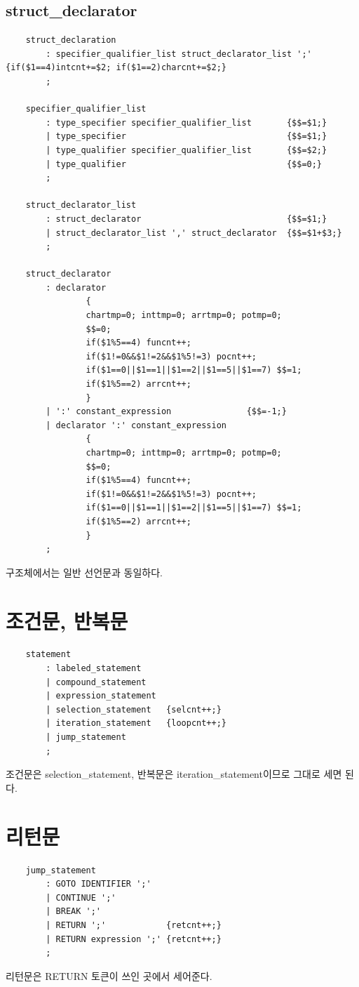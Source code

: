 \documentclass{oblivoir}
\begin{document}
\subsection{struct\_declarator}
\begin{verbatim}
    struct_declaration
        : specifier_qualifier_list struct_declarator_list ';' {if($1==4)intcnt+=$2; if($1==2)charcnt+=$2;}
        ;

    specifier_qualifier_list
        : type_specifier specifier_qualifier_list       {$$=$1;}
        | type_specifier                                {$$=$1;}
        | type_qualifier specifier_qualifier_list       {$$=$2;}
        | type_qualifier                                {$$=0;}
        ;

    struct_declarator_list
        : struct_declarator                             {$$=$1;}
        | struct_declarator_list ',' struct_declarator  {$$=$1+$3;}
        ;

    struct_declarator
        : declarator
                {
                chartmp=0; inttmp=0; arrtmp=0; potmp=0;
                $$=0;
                if($1%5==4) funcnt++;
                if($1!=0&&$1!=2&&$1%5!=3) pocnt++;
                if($1==0||$1==1||$1==2||$1==5||$1==7) $$=1;
                if($1%5==2) arrcnt++;
                }
        | ':' constant_expression               {$$=-1;}
        | declarator ':' constant_expression
                {
                chartmp=0; inttmp=0; arrtmp=0; potmp=0;
                $$=0;
                if($1%5==4) funcnt++;
                if($1!=0&&$1!=2&&$1%5!=3) pocnt++;
                if($1==0||$1==1||$1==2||$1==5||$1==7) $$=1;
                if($1%5==2) arrcnt++;
                }
        ;
\end{verbatim}
구조체에서는 일반 선언문과 동일하다.

\section{조건문, 반복문}
\begin{verbatim}
    statement
        : labeled_statement
        | compound_statement
        | expression_statement
        | selection_statement   {selcnt++;}
        | iteration_statement   {loopcnt++;}
        | jump_statement
        ;
\end{verbatim}
조건문은 selection\_statement, 반복문은 iteration\_statement이므로 그대로 세면 된다.

\section{리턴문}
\begin{verbatim}
    jump_statement
        : GOTO IDENTIFIER ';'
        | CONTINUE ';'
        | BREAK ';'
        | RETURN ';'            {retcnt++;}
        | RETURN expression ';' {retcnt++;}
        ;
\end{verbatim}
리턴문은 RETURN 토큰이 쓰인 곳에서 세어준다.
\end{document}
